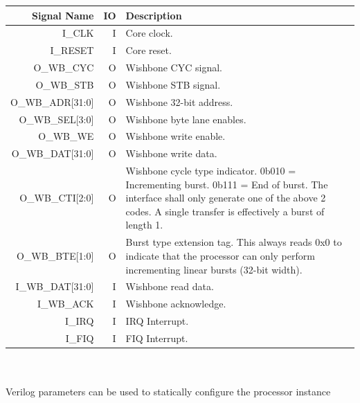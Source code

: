 \documentclass[10pt]{article}
\begin{document}
\begin{tabularx} {\linewidth}{|r|r|X|}
\hline
Signal Name & IO & Description \\ \hline

I\_CLK &
I &
Core clock. \\ \hline

I\_RESET &
I &
Core reset. \\ \hline

O\_WB\_CYC &
O &
Wishbone CYC signal. \\ \hline

O\_WB\_STB &
O & 
Wishbone STB signal. \\ \hline

O\_WB\_ADR[31:0] &
O &
Wishbone 32-bit address. \\ \hline

O\_WB\_SEL[3:0] &
O &
Wishbone byte lane enables. \\ \hline

O\_WB\_WE &
O &
Wishbone write enable. \\ \hline

O\_WB\_DAT[31:0] &
O &
Wishbone write data. \\ \hline

O\_WB\_CTI[2:0] &
O &
Wishbone cycle type indicator. \newline
0b010 = Incrementing burst. \newline
0b111 = End of burst. \newline
The interface shall only generate one of the above 2 codes. 
A single transfer is effectively a burst of length 1.\\ \hline

O\_WB\_BTE[1:0] &
O &
Burst type extension tag. This always reads 0x0 to indicate that
the processor can only perform incrementing linear bursts (32-bit width). 
\\ \hline

I\_WB\_DAT[31:0] &
I &
Wishbone read data. \\ \hline

I\_WB\_ACK &
I &
Wishbone acknowledge. \\ \hline

I\_IRQ &
I  &
IRQ Interrupt. \\ \hline

I\_FIQ &
I &
FIQ Interrupt. \\ \hline
\end{tabularx}
\\
\\
Verilog parameters can be used to statically configure the processor instance
\end{document}
